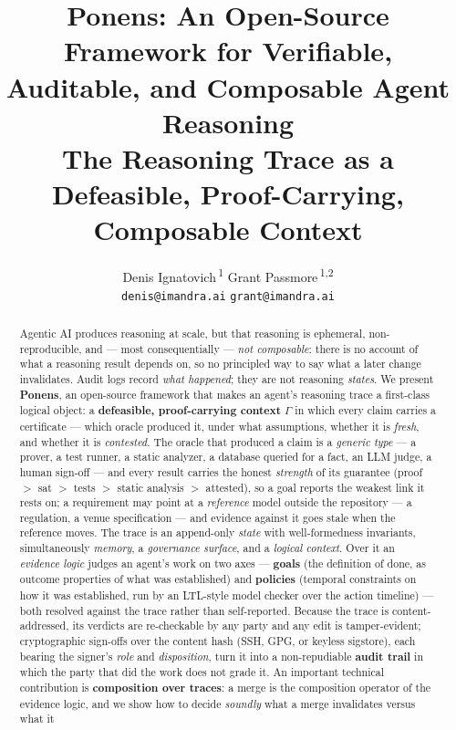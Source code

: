 \documentclass[11pt]{article}
\title{Ponens: An Open-Source Framework for Verifiable, Auditable, and Composable Agent Reasoning\\[3pt]
\large The Reasoning Trace as a Defeasible, Proof-Carrying, Composable Context}
\author{Denis Ignatovich\,\textsuperscript{1} \qquad Grant Passmore\,\textsuperscript{1,2}\\[3pt]
\normalsize \texttt{denis@imandra.ai} \qquad \texttt{grant@imandra.ai}}
\date{}
\begin{document}
\maketitle
{}
\setcounter{footnote}{2}

\begin{abstract}
Agentic AI produces reasoning at scale, but that reasoning is ephemeral, non-reproducible, and --- most
consequentially --- \emph{not composable}: there is no account of what a reasoning result depends on, so no
principled way to say what a later change invalidates. Audit logs record \emph{what happened}; they are not
reasoning \emph{states}. We present \textbf{Ponens}, an open-source framework that makes an agent's reasoning
trace a first-class logical object: a \textbf{defeasible, proof-carrying context} $\Gamma$ in which every
claim carries a certificate --- which oracle produced it, under what assumptions, whether it is \emph{fresh},
and whether it is \emph{contested}. The oracle that produced a claim is a \emph{generic type} --- a prover, a test
runner, a static analyzer, a database queried for a fact, an LLM judge, a human sign-off --- and every result
carries the honest \emph{strength} of its guarantee (proof $>$ sat $>$ tests $>$ static analysis $>$ attested),
so a goal reports the weakest link it rests on; a requirement may point at a \emph{reference} model outside the
repository --- a regulation, a venue specification --- and evidence against it goes stale when the reference
moves.
The trace is an append-only \emph{state} with well-formedness invariants, simultaneously \emph{memory}, a
\emph{governance surface}, and a \emph{logical context}. Over it an
\emph{evidence logic} judges an agent's work on two axes --- \textbf{goals} (the definition of done, as
outcome properties of what was established) and \textbf{policies} (temporal constraints on how it was
established, run by an \textrm{LTL}-style model checker over the action timeline) --- both resolved against
the trace rather than self-reported. Because the trace is content-addressed, its verdicts are re-checkable by
any party and any edit is tamper-evident; cryptographic sign-offs over the content hash (SSH, GPG, or keyless
sigstore), each bearing the signer's \emph{role} and \emph{disposition}, turn it into a non-repudiable
\textbf{audit trail} in which the party that did the work does not grade it. An
important technical contribution is \textbf{composition over traces}: a merge is the composition operator of
the evidence logic, and we show how to decide \emph{soundly} what a merge invalidates versus what it

\end{abstract}
\end{document}
